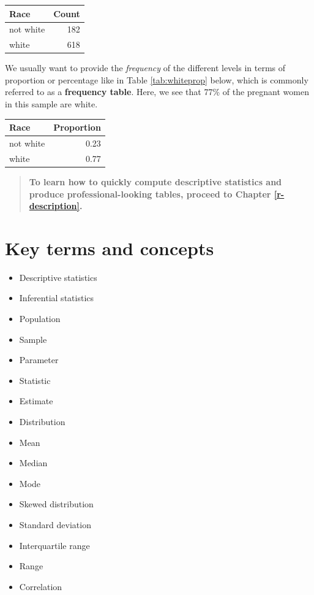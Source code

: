 \documentclass[
]{book}
\providecommand{\tightlist}{%
  \setlength{\itemsep}{0pt}\setlength{\parskip}{0pt}}
\begin{document}
\begin{tabular}{l|r}
\hline
Race & Count\\
\hline
not white & 182\\
\hline
white & 618\\
\hline
\end{tabular}

We usually want to provide the \emph{frequency} of the different levels in terms of proportion or percentage like in Table \ref{tab:whiteprop} below, which is commonly referred to as a \textbf{frequency table}. Here, we see that 77\% of the pregnant women in this sample are white.

\begin{tabular}{l|r}
\hline
Race & Proportion\\
\hline
not white & 0.23\\
\hline
white & 0.77\\
\hline
\end{tabular}

\begin{quote}
\textbf{To learn how to quickly compute descriptive statistics and produce professional-looking tables, proceed to Chapter \ref{r-description}.}
\end{quote}

\hypertarget{kt4}{%
\section{Key terms and concepts}\label{kt4}}

\begin{itemize}
\tightlist
\item
  Descriptive statistics
\item
  Inferential statistics
\item
  Population
\item
  Sample
\item
  Parameter
\item
  Statistic
\item
  Estimate
\item
  Distribution
\item
  Mean
\item
  Median
\item
  Mode
\item
  Skewed distribution
\item
  Standard deviation
\item
  Interquartile range
\item
  Range
\item
  Correlation
\end{itemize}
\end{document}
